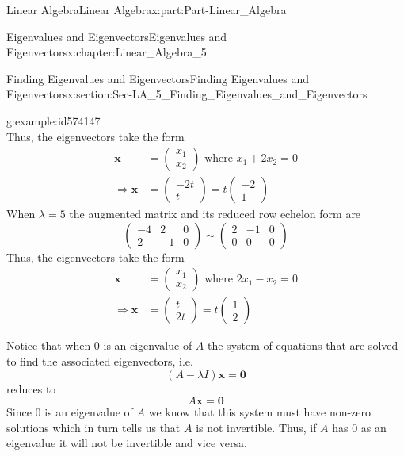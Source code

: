 \documentclass[oneside,10pt,]{book}
\numberwithin{equation}{section}
\newcommand{\amp}{&}
\begin{document}
\begin{partptx}{Linear Algebra}{}{Linear Algebra}{}{}{x:part:Part-Linear_Algebra}
\begin{chapterptx}{Eigenvalues and Eigenvectors}{}{Eigenvalues and Eigenvectors}{}{}{x:chapter:Linear_Algebra_5}
\begin{sectionptx}{Finding Eigenvalues and Eigenvectors}{}{Finding Eigenvalues and Eigenvectors}{}{}{x:section:Sec-LA_5_Finding_Eigenvalues_and_Eigenvectors}
\begin{example}{}{g:example:id574147}
\begin{equation*}
\end{equation*}
Thus, the eigenvectors take the form%
\begin{align*}
\mathbf{x} \amp =\begin{pmatrix} x_1 \\ x_2 \end{pmatrix} \textrm{ where } x_1+2x_2=0 \\
\Rightarrow \mathbf{x} \amp =\begin{pmatrix} -2t \\ t \end{pmatrix} = t\begin{pmatrix} -2 \\ 1 \end{pmatrix}
\end{align*}
When \(\lambda=5\) the augmented matrix and its reduced row echelon form are%
\begin{equation*}
\begin{pmatrix} -4 \amp 2 \amp 0 \\ 2 \amp -1 \amp 0 \end{pmatrix} \sim \begin{pmatrix} 2 \amp -1 \amp 0 \\ 0 \amp 0 \amp 0 \end{pmatrix} 
\end{equation*}
Thus, the eigenvectors take the form%
\begin{align*}
\mathbf{x} \amp =\begin{pmatrix} x_1 \\ x_2 \end{pmatrix} \textrm{ where } 2x_1-x_2=0 \\
\Rightarrow \mathbf{x} \amp =\begin{pmatrix} t \\ 2t \end{pmatrix} = t\begin{pmatrix} 1 \\ 2 \end{pmatrix}
\end{align*}
%
\end{example}
Notice that when \(0\) is an eigenvalue of \(A\) the system of equations that are solved to find the associated eigenvectors, i.e.%
\begin{equation*}
(A-\lambda I)\mathbf{x}=\mathbf{0}
\end{equation*}
reduces to%
\begin{equation*}
A\mathbf{x}=\mathbf{0}
\end{equation*}
Since \(0\) is an eigenvalue of \(A\) we know that this system must have non-zero solutions which in turn tells us that \(A\) is not invertible. Thus, if \(A\) has \(0\) as an eigenvalue it will not be invertible and vice versa.%

\end{sectionptx}
\end{chapterptx}
\end{partptx}
\end{document}
